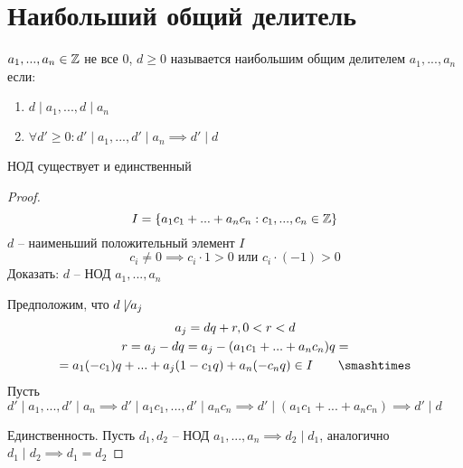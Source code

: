 \documentclass[main]{subfiles}
\begin{document}
\chapter[НОД]{Наибольший общий делитель}
\begin{definition}
    $a_1, ..., a_n \in \mathbb{Z}$ не все $0$, $d\ge 0$ называется наибольшим
    общим делителем $a_1, ..., a_n$ если:
    \begin{enumerate}
        \item $d \mid a_1, ...,  d\mid  a_n$
        \item $\forall d' \ge 0: d'\mid a_1, ..., d' \mid a_n \implies d'\mid d$
    \end{enumerate}
\end{definition}

\begin{proposition}
    НОД существует и единственный
\end{proposition}
\begin{proof}
    \[I = \{a_1 c_1+ ... + a_n c_n : c_1, ..., c_n \in \mathbb{Z}\}\]
    $d$ -- наименьший положительный элемент $I$
    \[c_i \neq 0 \implies c_i \cdot 1 >0 \text{ или } c_i\cdot(-1)>0\]
    Доказать: $d$ -- НОД $a_1, ..., a_n$

    Предположим, что $d \not\mid a_j$
    \begin{gather*}
        a_j = dq+r, 0 < r < d\\
        r = a_j -dq = a_j - (a_1 c_1 + ... + a_n c_n)q=\\
        = a_1 (-c_1)q + ... + a_j(1-c_1q ) + a_n (-c_nq) \in I \qquad \contradiction
    \end{gather*}
    Пусть $d' \mid a_1, ..., d'\mid a_n \implies d'\mid a_1 c_1, ...,
        d'\mid a_n c_n \implies d' \mid (a_1 c_1 + ... + a_n c_n) \implies d'\mid d$

    Единственность. Пусть $d_1, d_2$ -- НОД $a_1, ..., a_n \implies d_2 \mid d_1$,
    аналогично $d_1\mid d_2 \implies d_1 = d_2$
\end{proof}
\end{document}
